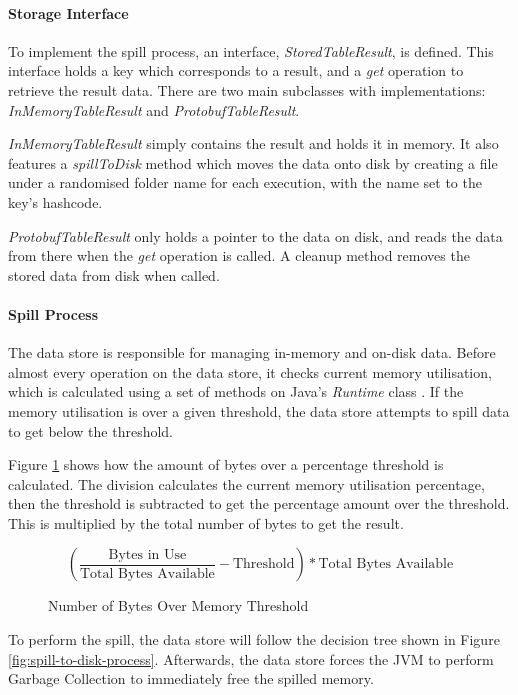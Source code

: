 \paragraph{Storage Interface}
To implement the spill process, an interface, \textit{StoredTableResult}, is defined. This interface holds a key which corresponds to a result, and a \textit{get} operation to retrieve the result data. There are two main subclasses with implementations: \textit{InMemoryTableResult} and \textit{ProtobufTableResult}. 

\textit{InMemoryTableResult} simply contains the result and holds it in memory. It also features a \textit{spillToDisk} method which moves the data onto disk by creating a file under a randomised folder name for each execution, with the name set to the key's hashcode.

\textit{ProtobufTableResult} only holds a pointer to the data on disk, and reads the data from there when the \textit{get} operation is called. A cleanup method removes the stored data from disk when called.

\paragraph{Spill Process}
The data store is responsible for managing in-memory and on-disk data. Before almost every operation on the data store, it checks current memory utilisation, which is calculated using a set of methods on Java's \textit{Runtime} class \cite{javaruntimeclass}. If the memory utilisation is over a given threshold, the data store attempts to spill data to get below the threshold.

Figure \ref{fig:bytes-over-memory-threshold} shows how the amount of bytes over a percentage threshold is calculated. The division calculates the current memory utilisation percentage, then the threshold is subtracted to get the percentage amount over the threshold. This is multiplied by the total number of bytes to get the result.

\begin{figure}[h]
	\centering
	\[ \left( \frac{\text{Bytes in Use}}{\text{Total Bytes Available}} - \text{Threshold} \right) * \text{Total Bytes Available} \]
	\caption{Number of Bytes Over Memory Threshold}
	\label{fig:bytes-over-memory-threshold}
\end{figure}

To perform the spill, the data store will follow the decision tree shown in Figure \ref{fig:spill-to-disk-process}. Afterwards, the data store forces the JVM to perform Garbage Collection to immediately free the spilled memory.

